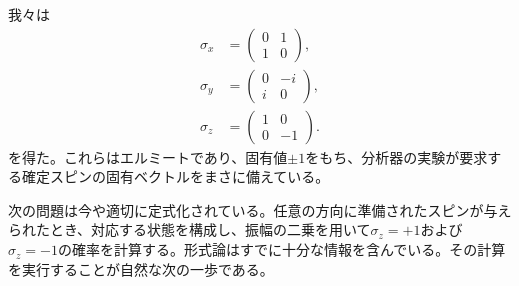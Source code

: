 我々は
\begin{equation}
\begin{aligned}
\sigma_x&=\begin{pmatrix}0&1\\1&0\end{pmatrix},\\[0.4em]
\sigma_y&=\begin{pmatrix}0&-i\\i&0\end{pmatrix},\\[0.4em]
\sigma_z&=\begin{pmatrix}1&0\\0&-1\end{pmatrix}.
\end{aligned}
\label{eq:pauli-triple}
\end{equation}
を得た。これらはエルミートであり、固有値\(\pm1\)をもち、分析器の実験が要求する確定スピンの固有ベクトルをまさに備えている。

次の問題は今や適切に定式化されている。任意の方向に準備されたスピンが与えられたとき、対応する状態を構成し、振幅の二乗を用いて\(\sigma_z=+1\)および\(\sigma_z=-1\)の確率を計算する。形式論はすでに十分な情報を含んでいる。その計算を実行することが自然な次の一歩である。
